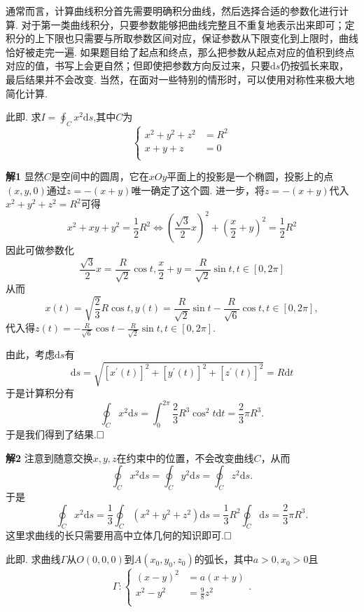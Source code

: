 \documentclass{ctexart}
\newenvironment{custom}[1]{\par\noindent \textbf{#1}\quad}{\par\vspace{1em}}
\begin{document}
通常而言，计算曲线积分首先需要明确积分曲线，然后选择合适的参数化进行计算. 对于第一类曲线积分，只要参数能够把曲线完整且不重复地表示出来即可；定积分的上下限也只需要与所取参数区间对应，保证参数从下限变化到上限时，曲线恰好被走完一遍. 如果题目给了起点和终点，那么把参数从起点对应的值积到终点对应的值，书写上会更自然；但即使把参数方向反过来，只要$\mathrm{d}s$仍按弧长来取，最后结果并不会改变. 当然，在面对一些特别的情形时，可以使用对称性来极大地简化计算.


\begin{example}
此即\cite[例题24.1.1]{XHM}. 求$I=\oint_{C}{x^{2}\mathrm{d}s}$,其中$C$为
$$\left\{\begin{aligned}x^{2}+y^{2}+z^{2}&=R^{2}\\ x+y+z&=0\\\end{aligned}\right.$$
\end{example}

\begin{custom}{解1}
显然$C$是空间中的圆周，它在$xOy$平面上的投影是一个椭圆，投影上的点$(x,y,0)$通过$z=-(x+y)$唯一确定了这个圆. 进一步，将$z=-(x+y)$代入$x^{2}+y^{2}+z^{2}=R^{2}$可得
$$x^{2}+xy+y^{2}=\frac{1}{2}R^{2}\Leftrightarrow \left(\frac{\sqrt{3}}{2}x\right)^{2}+\left(\frac{x}{2}+y\right)^{2}=\frac{1}{2}R^{2}$$
因此可做参数化
$$\frac{\sqrt{3}}{2}x=\frac{R}{\sqrt{2}}\cos{t}, \frac{x}{2}+y=\frac{R}{\sqrt{2}}\sin{t},t\in[0,2\pi]$$
从而
$$x(t)=\sqrt{\frac{2}{3}}R\cos{t},y(t)=\frac{R}{\sqrt{2}}\sin{t}-\frac{R}{\sqrt{6}}\cos{t},t\in[0,2\pi],$$
代入得$z(t)=-\frac{R}{\sqrt{6}}\cos{t}-\frac{R}{\sqrt{2}}\sin{t},t\in[0,2\pi].$

由此，考虑$\mathrm{d}s$有
$$\mathrm{d}s=\sqrt{[x^{\prime}(t)]^{2}+[y^{\prime}(t)]^{2}+[z^{\prime}(t)]^{2}}=R\mathrm{d}t$$
于是计算积分有
$$\oint_{C}{x^{2}\mathrm{d}s}=\int_{0}^{2\pi}{\frac{2}{3}R^{3}\cos^{2}{t}\mathrm{d}t}=\frac{2}{3}\pi R^{3}.$$
于是我们得到了结果.$\hfill{\square}$
\end{custom}

\begin{custom}{解2}
注意到随意交换$x,y,z$在约束中的位置，不会改变曲线$C$，从而
$$\oint_{C}{x^{2}\mathrm{d}s}=\oint_{C}{y^{2}\mathrm{d}s}=\oint_{C}{z^{2}\mathrm{d}s}.$$
于是
$$\oint_{C}{x^{2}\mathrm{d}s}=\frac{1}{3}\oint_{C}{(x^{2}+y^{2}+z^{2})\mathrm{d}s}=\frac{1}{3}R^{2}\oint_{C}{\mathrm{d}s}=\frac{2}{3}\pi R^{3}.$$
这里求曲线的长只需要用高中立体几何的知识即可.$\hfill{\square}$
\end{custom}

\begin{example}
此即\cite[例题24.1.2]{XHM}. 求曲线$\Gamma$从$O(0,0,0)$到$A(x_{0},y_{0},z_{0})$的弧长，其中$a>0,x_{0}>0$且
$$\Gamma:\left\{\begin{aligned}(x-y)^{2}&=a(x+y)\\ x^{2}-y^{2}&=\frac{9}{8}z^{2}\\\end{aligned}\right..$$
\end{example}
\end{document}
